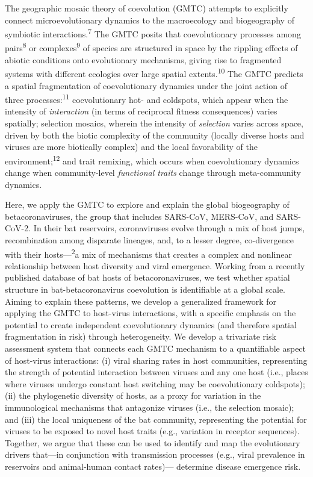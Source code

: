 \documentclass[10pt,oneside]{article}
\begin{document}
The geographic mosaic theory of coevolution (GMTC) attempts to
explicitly connect microevolutionary dynamics to the macroecology and
biogeography of symbiotic interactions.\textsuperscript{7} The GMTC
posits that coevolutionary processes among pairs\textsuperscript{8} or
complexes\textsuperscript{9} of species are structured in space by the
rippling effects of abiotic conditions onto evolutionary mechanisms,
giving rise to fragmented systems with different ecologies over large
spatial extents.\textsuperscript{10} The GMTC predicts a spatial
fragmentation of coevolutionary dynamics under the joint action of three
processes:\textsuperscript{11} coevolutionary hot- and coldspots, which
appear when the intensity of \emph{interaction} (in terms of reciprocal
fitness consequences) varies spatially; selection mosaics, wherein the
intensity of \emph{selection} varies across space, driven by both the
biotic complexity of the community (locally diverse hosts and viruses
are more biotically complex) and the local favorability of the
environment;\textsuperscript{12} and trait remixing, which occurs when
coevolutionary dynamics change when community-level \emph{functional
traits} change through meta-community dynamics.

Here, we apply the GMTC to explore and explain the global biogeography
of betacoronaviruses, the group that includes SARS-CoV, MERS-CoV, and
SARS-CoV-2. In their bat reservoirs, coronaviruses evolve through a mix
of host jumps, recombination among disparate lineages, and, to a lesser
degree, co-divergence with their hosts---\textsuperscript{2}a mix of
mechanisms that creates a complex and nonlinear relationship between
host diversity and viral emergence. Working from a recently published
database of bat hosts of betacoronaviruses, we test whether spatial
structure in bat-betacoronavirus coevolution is identifiable at a global
scale. Aiming to explain these patterns, we develop a generalized
framework for applying the GMTC to host-virus interactions, with a
specific emphasis on the potential to create independent coevolutionary
dynamics (and therefore spatial fragmentation in risk) through
heterogeneity. We develop a trivariate risk assessment system that
connects each GMTC mechanism to a quantifiable aspect of host-virus
interactions: (i) viral sharing rates in host communities, representing
the strength of potential interaction between viruses and any one host
(i.e., places where viruses undergo constant host switching may be
coevolutionary coldspots); (ii) the phylogenetic diversity of hosts, as
a proxy for variation in the immunological mechanisms that antagonize
viruses (i.e., the selection mosaic); and (iii) the local uniqueness of
the bat community, representing the potential for viruses to be exposed
to novel host traits (e.g., variation in receptor sequences). Together,
we argue that these can be used to identify and map the evolutionary
drivers that---in conjunction with transmission processes (e.g., viral
prevalence in reservoirs and animal-human contact rates)--- determine
disease emergence risk.
\end{document}
